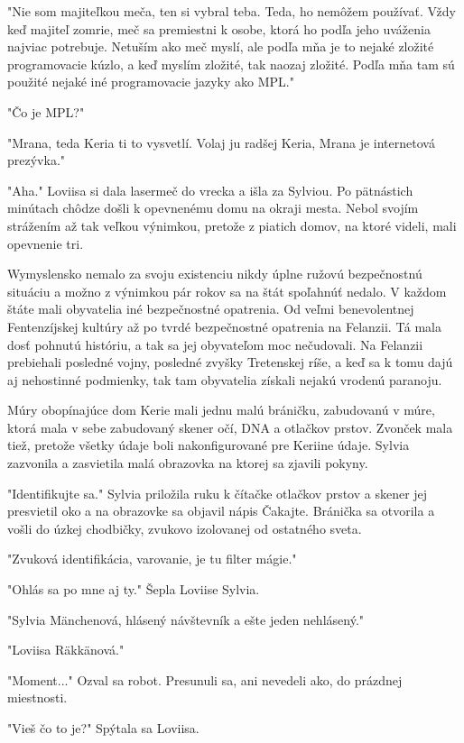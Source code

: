 \documentclass{book}
\begin{document}
"$ $Nie som majiteľkou meča, ten si vybral teba. Teda, ho nemôžem používať. Vždy keď majiteľ zomrie, meč sa premiestni k osobe, ktorá ho podľa jeho uváženia najviac potrebuje. Netuším ako meč myslí, ale podľa mňa je to nejaké zložité programovacie kúzlo, a keď myslím zložité, tak naozaj zložité. Podľa mňa tam sú použité nejaké iné programovacie jazyky ako MPL."$ $ 

"$ $Čo je MPL?"$ $ 

"$ $Mrana, teda Keria ti to vysvetlí. Volaj ju radšej Keria, Mrana je internetová prezývka."$ $ 

"$ $Aha."$ $  Loviisa si dala lasermeč do vrecka a išla za Sylviou. Po pätnástich minútach chôdze došli k opevnenému domu na okraji mesta. Nebol svojím strážením až tak veľkou výnimkou, pretože z piatich domov, na ktoré videli, mali opevnenie tri.

Wymyslensko nemalo za svoju existenciu nikdy úplne ružovú bezpečnostnú situáciu a možno z výnimkou pár rokov sa na štát spoľahnúť nedalo. V každom štáte mali obyvatelia iné bezpečnostné opatrenia. Od veľmi benevolentnej Fentenzíjskej kultúry až po tvrdé bezpečnostné opatrenia na Felanzii. Tá mala dosť pohnutú históriu, a tak sa jej obyvateľom moc nečudovali. Na Felanzii prebiehali posledné vojny, posledné zvyšky Tretenskej ríše, a keď sa k tomu dajú aj nehostinné podmienky, tak tam obyvatelia získali nejakú vrodenú paranoju.

Múry obopínajúce dom Kerie mali jednu malú bráničku, zabudovanú v múre, ktorá mala v sebe zabudovaný skener očí, DNA a otlačkov prstov. Zvonček mala tiež, pretože všetky údaje boli nakonfigurované pre Keriine údaje. Sylvia zazvonila a zasvietila malá obrazovka na ktorej sa zjavili pokyny.

"$ $Identifikujte sa."$ $  Sylvia priložila ruku k čítačke otlačkov prstov a skener jej presvietil oko a na obrazovke sa objavil nápis Čakajte. Bránička sa otvorila a vošli do úzkej chodbičky, zvukovo izolovanej od ostatného sveta.

"$ $Zvuková identifikácia, varovanie, je tu filter mágie."$ $ 

"$ $Ohlás sa po mne aj ty."$ $  Šepla Loviise Sylvia.

"$ $Sylvia Mänchenová, hlásený návštevník a ešte jeden nehlásený."$ $ 

"$ $Loviisa Räkkänová."$ $ 

"$ $Moment..."$ $  Ozval sa robot. Presunuli sa, ani nevedeli ako, do prázdnej miestnosti.

"$ $Vieš čo to je?"$ $  Spýtala sa Loviisa.
\end{document}
